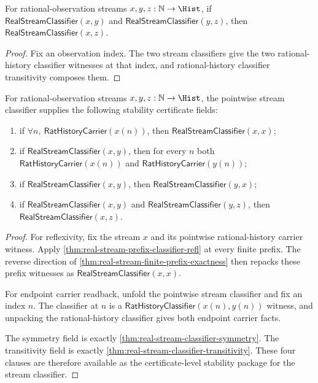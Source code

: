 \begin{theorem}
\label{thm:real-stream-classifier-transitivity}
For rational-observation streams $x,y,z:\mathbb{N}\to\Hist$, if
$\mathsf{RealStreamClassifier}(x,y)$ and
$\mathsf{RealStreamClassifier}(y,z)$, then
$\mathsf{RealStreamClassifier}(x,z)$.
\end{theorem}
\begin{proof}
Fix an observation index. The two stream classifiers give the two
rational-history classifier witnesses at that index, and rational-history
classifier transitivity composes them.
\end{proof}

\begin{theorem}
\label{thm:real-stream-classifier-certificate-fields}
For rational-observation streams $x,y,z:\mathbb{N}\to\Hist$, the pointwise
stream classifier supplies the following stability certificate fields:
\begin{enumerate}
  \item if $\forall n,\ \mathsf{RatHistoryCarrier}(x(n))$, then
  $\mathsf{RealStreamClassifier}(x,x)$;
  \item if $\mathsf{RealStreamClassifier}(x,y)$, then for every $n$ both
  $\mathsf{RatHistoryCarrier}(x(n))$ and $\mathsf{RatHistoryCarrier}(y(n))$;
  \item if $\mathsf{RealStreamClassifier}(x,y)$, then
  $\mathsf{RealStreamClassifier}(y,x)$;
  \item if $\mathsf{RealStreamClassifier}(x,y)$ and
  $\mathsf{RealStreamClassifier}(y,z)$, then
  $\mathsf{RealStreamClassifier}(x,z)$.
\end{enumerate}
\end{theorem}
\begin{proof}
For reflexivity, fix the stream $x$ and its pointwise rational-history carrier
witness. Apply \autoref{thm:real-stream-prefix-classifier-refl} at every finite
prefix. The reverse direction of
\autoref{thm:real-stream-finite-prefix-exactness} then repacks these prefix
witnesses as $\mathsf{RealStreamClassifier}(x,x)$.

For endpoint carrier readback, unfold the pointwise stream classifier and fix an
index $n$. The classifier at $n$ is a $\mathsf{RatHistoryClassifier}(x(n),y(n))$
witness, and unpacking the rational-history classifier gives both endpoint
carrier facts.

The symmetry field is exactly
\autoref{thm:real-stream-classifier-symmetry}. The transitivity field is exactly
\autoref{thm:real-stream-classifier-transitivity}. These four clauses are
therefore available as the certificate-level stability package for the stream
classifier.
\end{proof}

